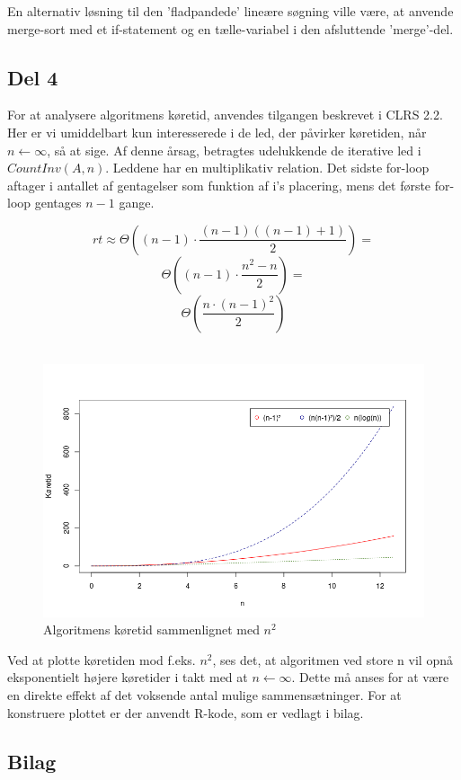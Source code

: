 \documentclass[a4paper,10pt]{article}
\begin{document}
En alternativ løsning til den 'fladpandede' lineære søgning ville være, at anvende merge-sort med et if-statement og en tælle-variabel i den afsluttende 'merge'-del.

\subsection*{Del 4}

For at analysere algoritmens køretid, anvendes tilgangen beskrevet i CLRS 2.2. Her er vi umiddelbart kun interesserede i de led, der påvirker køretiden, når $n\leftarrow \infty$, så at sige. Af denne årsag, betragtes udelukkende de iterative led i $CountInv(A,n)$. Leddene har en multiplikativ relation. Det sidste for-loop aftager i  antallet af gentagelser som funktion af i's placering, mens det første for-loop gentages $n-1$ gange.
\newline

$$
rt \approx \Theta((n-1)\cdot\frac{(n-1)((n-1)+1)}{2}) =
$$
$$
\Theta((n-1)\cdot\frac{n^{2}- n}{2}) =
$$
$$
\Theta(\frac{n\cdot(n-1)^{2}}{2})
$$
\\
\begin{figure}[H]
\centering
\includegraphics[scale = 0.5]{plotR1.png}
\caption{Algoritmens køretid sammenlignet med $n^{2}$}
\end{figure}

Ved at plotte køretiden mod f.eks. $n^{2}$, ses det, at algoritmen ved store n vil opnå eksponentielt højere køretider i takt med at $n\leftarrow\infty$. Dette må anses for at være en direkte effekt af det voksende antal mulige sammensætninger. 
For at konstruere plottet er der anvendt R-kode, som er vedlagt i bilag. 

\subsection*{Bilag}

 
\end{document}
